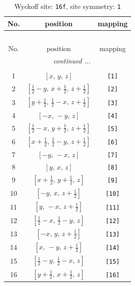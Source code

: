 \documentclass[fleqn,8pt]{jsarticle}
\begin{document}
\begin{longtable}{ccc}
\caption{Wyckoff site: {\tt 16f}, site symmetry: {\tt 1}}
 \\
 \hline \hline
No. & position & mapping \\ \hline \endfirsthead

\multicolumn{2}{l}{\tablename\ \thetable{}} \\
 \hline \hline
No. & position & mapping \\ \hline \endhead

 \hline \hline
\multicolumn{2}{r}{\footnotesize\it continued ...} \\ \endfoot

 \hline \hline
\multicolumn{2}{r}{} \\ \endlastfoot

1 & $\left[ x,\, y,\, z \right]$ & {\tt [1]} \\ \hline
2 & $\left[ \frac{1}{2} - y,\, x + \frac{1}{2},\, z + \frac{1}{2} \right]$ & {\tt [2]} \\ \hline
3 & $\left[ y + \frac{1}{2},\, \frac{1}{2} - x,\, z + \frac{1}{2} \right]$ & {\tt [3]} \\ \hline
4 & $\left[ - x,\, - y,\, z \right]$ & {\tt [4]} \\ \hline
5 & $\left[ \frac{1}{2} - x,\, y + \frac{1}{2},\, z + \frac{1}{2} \right]$ & {\tt [5]} \\ \hline
6 & $\left[ x + \frac{1}{2},\, \frac{1}{2} - y,\, z + \frac{1}{2} \right]$ & {\tt [6]} \\ \hline
7 & $\left[ - y,\, - x,\, z \right]$ & {\tt [7]} \\ \hline
8 & $\left[ y,\, x,\, z \right]$ & {\tt [8]} \\ \hline
9 & $\left[ x + \frac{1}{2},\, y + \frac{1}{2},\, z \right]$ & {\tt [9]} \\ \hline
10 & $\left[ - y,\, x,\, z + \frac{1}{2} \right]$ & {\tt [10]} \\ \hline
11 & $\left[ y,\, - x,\, z + \frac{1}{2} \right]$ & {\tt [11]} \\ \hline
12 & $\left[ \frac{1}{2} - x,\, \frac{1}{2} - y,\, z \right]$ & {\tt [12]} \\ \hline
13 & $\left[ - x,\, y,\, z + \frac{1}{2} \right]$ & {\tt [13]} \\ \hline
14 & $\left[ x,\, - y,\, z + \frac{1}{2} \right]$ & {\tt [14]} \\ \hline
15 & $\left[ \frac{1}{2} - y,\, \frac{1}{2} - x,\, z \right]$ & {\tt [15]} \\ \hline
16 & $\left[ y + \frac{1}{2},\, x + \frac{1}{2},\, z \right]$ & {\tt [16]} \\
\end{longtable}
\end{document}
